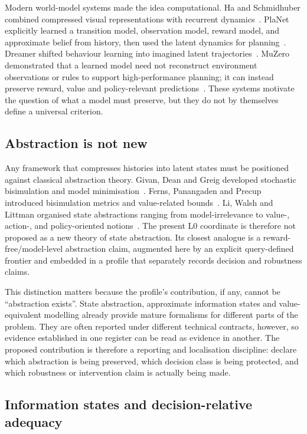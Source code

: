 \documentclass[10pt]{article}
\begin{document}
Modern world-model systems made the idea computational. Ha and Schmidhuber combined compressed visual representations with recurrent dynamics~\cite{ha2018}. PlaNet explicitly learned a transition model, observation model, reward model, and approximate belief from history, then used the latent dynamics for planning~\cite{hafner2019}. Dreamer shifted behaviour learning into imagined latent trajectories~\cite{hafner2020}. MuZero demonstrated that a learned model need not reconstruct environment observations or rules to support high-performance planning; it can instead preserve reward, value and policy-relevant predictions~\cite{schrittwieser2020}. These systems motivate the question of what a model must preserve, but they do not by themselves define a universal criterion.

\subsection{Abstraction is not new}

Any framework that compresses histories into latent states must be positioned against classical abstraction theory. Givan, Dean and Greig developed stochastic bisimulation and model minimisation~\cite{givan2003}. Ferns, Panangaden and Precup introduced bisimulation metrics and value-related bounds~\cite{ferns2004}. Li, Walsh and Littman organised state abstractions ranging from model-irrelevance to value-, action-, and policy-oriented notions~\cite{li2006}. The present L0 coordinate is therefore not proposed as a new theory of state abstraction. Its closest analogue is a reward-free/model-level abstraction claim, augmented here by an explicit query-defined frontier and embedded in a profile that separately records decision and robustness claims.

This distinction matters because the profile's contribution, if any, cannot be ``abstraction exists''. State abstraction, approximate information states and value-equivalent modelling already provide mature formalisms for different parts of the problem. They are often reported under different technical contracts, however, so evidence established in one register can be read as evidence in another. The proposed contribution is therefore a reporting and localisation discipline: declare which abstraction is being preserved, which decision class is being protected, and which robustness or intervention claim is actually being made.

\subsection{Information states and decision-relative adequacy}
\end{document}
